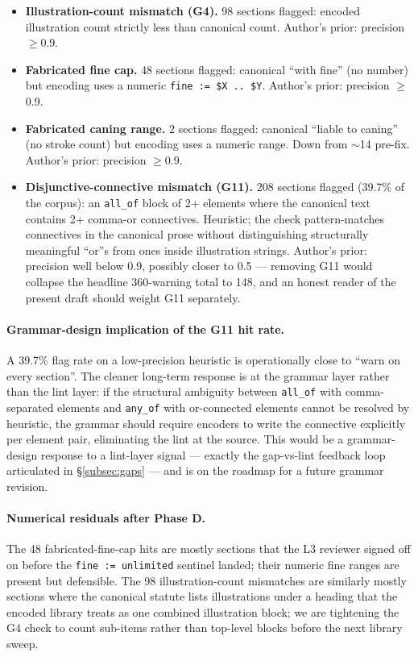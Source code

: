 \begin{itemize}
\item \textbf{Illustration-count mismatch (\textsf{G4}).} 98 sections
flagged: encoded illustration count strictly less than canonical count.
Author's prior: precision $\geq$0.9.
\item \textbf{Fabricated fine cap.} 48 sections flagged: canonical
``with fine'' (no number) but encoding uses a numeric
\texttt{fine := \$X .. \$Y}. Author's prior: precision $\geq$0.9.
\item \textbf{Fabricated caning range.} 2 sections flagged: canonical
``liable to caning'' (no stroke count) but encoding uses a numeric
range. Down from $\sim$14 pre-fix. Author's prior: precision $\geq$0.9.
\item \textbf{Disjunctive-connective mismatch (\textsf{G11}).} 208
sections flagged (39.7\% of the corpus): an \texttt{all\_of} block of
2+ elements where the canonical text contains 2+ comma-or connectives.
Heuristic; the check pattern-matches connectives in the canonical
prose without distinguishing structurally meaningful ``or''s from
ones inside illustration strings. Author's prior: precision well
below 0.9, possibly closer to 0.5 --- removing G11 would collapse the
headline 360-warning total to 148, and an honest reader of the present
draft should weight G11 separately.
\end{itemize}

\paragraph{Grammar-design implication of the G11 hit rate.} A 39.7\%
flag rate on a low-precision heuristic is operationally close to
``warn on every section''. The cleaner long-term response is at the
grammar layer rather than the lint layer: if the structural ambiguity
between \texttt{all\_of} with comma-separated elements and
\texttt{any\_of} with or-connected elements cannot be resolved by
heuristic, the grammar should require encoders to write the
connective explicitly per element pair, eliminating the lint at the
source. This would be a grammar-design response to a lint-layer
signal --- exactly the gap-vs-lint feedback loop articulated in
\S\ref{subsec:gaps} --- and is on the roadmap for a future grammar
revision.

\paragraph{Numerical residuals after Phase D.} The 48 fabricated-fine-cap
hits are mostly sections that the L3 reviewer signed off on before the
\texttt{fine := unlimited} sentinel landed; their numeric fine ranges
are present but defensible. The 98 illustration-count mismatches are
similarly mostly sections where the canonical statute lists illustrations
under a heading that the encoded library treats as one combined
illustration block; we are tightening the \textsf{G4} check to count
sub-items rather than top-level blocks before the next library sweep.

